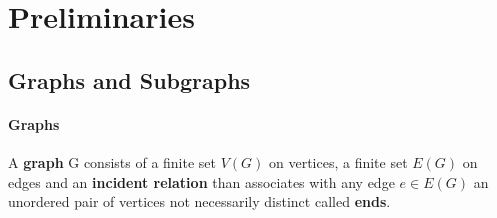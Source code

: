         \section{Preliminaries}
            \subsection{Graphs and Subgraphs}
                \paragraph{Graphs}
                    \begin{definition}[Graph]
                        A \textbf{graph} G consists of a finite set $V(G)$ on vertices, a finite set $E(G)$ on edges and an \textbf{incident relation} than associates with any edge $e\in E(G)$ an unordered pair of vertices not necessarily distinct called \textbf{ends}.
                    \end{definition}

